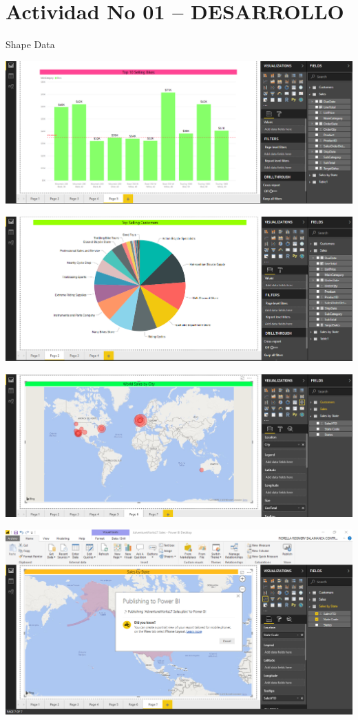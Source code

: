 \section{Actividad No 01 – DESARROLLO} 

 Shape Data \\

	\begin{center}
	\includegraphics[width=15cm]{./Imagenes/21.png}
	\end{center}	
	\begin{center}
	\includegraphics[width=15cm]{./Imagenes/22.png}
	\end{center}	
\begin{center}
	\includegraphics[width=15cm]{./Imagenes/23.png}
	\end{center}	
\begin{center}
	\includegraphics[width=15cm]{./Imagenes/24.png}
	\end{center}	

